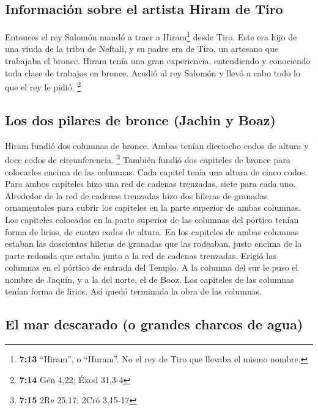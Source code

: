 \hypertarget{informaciuxf3n-sobre-el-artista-hiram-de-tiro}{%
\subsection{Información sobre el artista Hiram de
Tiro}\label{informaciuxf3n-sobre-el-artista-hiram-de-tiro}}

 Entonces el rey Salomón mandó a traer a Hiram\footnote{\textbf{7:13}
  ``Hiram'', o ``Huram''. No el rey de Tiro que llevaba el mismo nombre.}
desde Tiro.  Este era hijo de una viuda de la tribu de
Neftalí, y su padre era de Tiro, un artesano que trabajaba el bronce.
Hiram tenía una gran experiencia, entendiendo y conociendo toda clase de
trabajos en bronce. Acudió al rey Salomón y llevó a cabo todo lo que el
rey le pidió. \footnote{\textbf{7:14} Gén 4,22; Éxod 31,3-4}

\hypertarget{los-dos-pilares-de-bronce-jachin-y-boaz}{%
\subsection{Los dos pilares de bronce (Jachin y
Boaz)}\label{los-dos-pilares-de-bronce-jachin-y-boaz}}

 Hiram fundió dos columnas de bronce. Ambas tenían
dieciocho codos de altura y doce codos de circunferencia. \footnote{\textbf{7:15}
  2Re 25,17; 2Cró 3,15-17}  También fundió dos capiteles
de bronce para colocarlos encima de las columnas. Cada capitel tenía una
altura de cinco codos.  Para ambos capiteles hizo una red
de cadenas trenzadas, siete para cada uno.  Alrededor de
la red de cadenas trenzadas hizo dos hileras de granadas ornamentales
para cubrir los capiteles en la parte superior de ambas columnas.
 Los capiteles colocados en la parte superior de las
columnas del pórtico tenían forma de lirios, de cuatro codos de altura.
 En los capiteles de ambas columnas estaban las
doscientas hileras de granadas que las rodeaban, justo encima de la
parte redonda que estaba junto a la red de cadenas trenzadas.
 Erigió las columnas en el pórtico de entrada del Templo.
A la columna del sur le puso el nombre de Jaquín, y a la del norte, el
de Booz.  Los capiteles de las columnas tenían forma de
lirios. Así quedó terminada la obra de las columnas.

\hypertarget{el-mar-descarado-o-grandes-charcos-de-agua}{%
\subsection{El mar descarado (o grandes charcos de
agua)}\label{el-mar-descarado-o-grandes-charcos-de-agua}}

